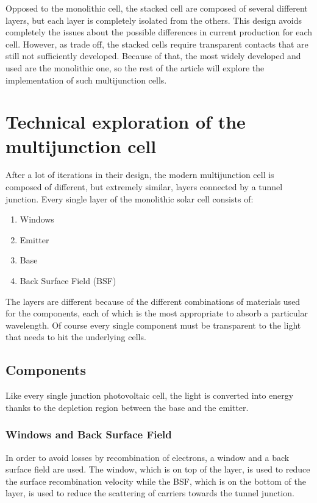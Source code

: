\documentclass[11pt]{article} %
\begin{document}
Opposed to the monolithic cell, the stacked cell are composed of several different layers, but each layer is completely isolated from the others.  This design avoids completely the issues about the possible differences in current production for each cell. However, as trade off, the stacked cells require transparent contacts that are still not sufficiently developed.  Because of that, the most widely developed and used are the monolithic one, so the rest of the article will explore the implementation of such multijunction cells.

\section{Technical exploration of the multijunction cell}

After a lot of iterations in their design, the modern multijunction cell is composed of different, but extremely similar, layers connected by a tunnel junction. Every single layer of the monolithic solar cell consists of:  
\begin{enumerate}
	\item Windows 
	\item Emitter 
	\item Base 
	\item Back Surface Field (BSF) 
\end{enumerate}
The layers are different because of the different combinations of materials used for the components, each of which is the most appropriate to absorb a particular wavelength. Of course every single component must be transparent to the light that needs to hit the underlying cells. 

\subsection{Components}  

Like every single junction photovoltaic cell, the light is converted into energy thanks to the depletion region between the base and the emitter.  

\subsubsection{Windows and Back Surface Field}  
In order to avoid losses by recombination of electrons, a window and a back surface field are used.  The window, which is on top of the layer, is used to reduce the surface recombination velocity while the BSF, which is on the bottom of the layer, is used to reduce the scattering of carriers towards the tunnel junction.  
\end{document}
